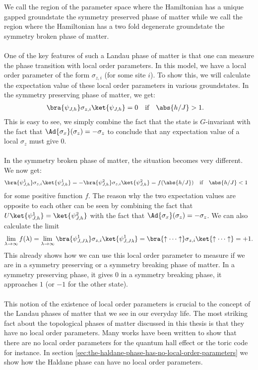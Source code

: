 We call the region of the parameter space where the Hamiltonian has a unique gapped groundstate the symmetry preserved phase of matter while we call the region where the Hamiltonian has a two fold degenerate groundstate the symmetry broken phase of matter.\\\\
One of the key features of such a Landau phase of matter is that one can measure the phase transition with local order parameters. In this model, we have a local order parameter of the form $\sigma_{z,i}$ (for some site $i$). To show this, we will calculate the expectation value of these local order parameters in various groundstates. In the symmetry preserving phase of matter, we get:
\begin{align}
	\bra{\psi_{J,h}}\sigma_{z,i} \ket{\psi_{J,h}}&=0&&\text{if}&\abs{h/J}&>1.
\end{align}
This is easy to see, we simply combine the fact that the state is $G$-invariant with the fact that $\Ad{\sigma_x}(\sigma_z)=-\sigma_z$ to conclude that any expectation value of a local $\sigma_z$ must give 0.
\\\\
In the symmetry broken phase of matter, the situation becomes very different. We now get:
\begin{align}
\bra{\psi_{J,h}^1}\sigma_{z,i} \ket{\psi_{J,h}^1}&=-\bra{\psi_{J,h}^2}\sigma_{z,i} \ket{\psi_{J,h}^2}=f(\abs{h/J})&&\text{if}&\abs{h/J}&<1
\end{align}
for some positive function $f$. The reason why the two expectation values are opposite to each other can be seen by combining the fact that $U\ket{\psi_{J,h}^1}=\ket{\psi_{J,h}^2}$ with the fact that $\Ad{\sigma_x}(\sigma_z)=-\sigma_z$. We can also calculate the limit
\begin{equation}
	\lim_{\lambda\rightarrow\infty}f(\lambda)=\lim_{\lambda\rightarrow\infty}\bra{\psi_{J,J\lambda}^1}\sigma_{z,i} \ket{\psi_{J,J\lambda}^1}=\bra{\uparrow\cdots\uparrow}\sigma_{z,i}\ket{\uparrow\cdots\uparrow}=+1.
\end{equation}
This already shows how we can use this local order parameter to measure if we are in a symmetry preserving or a symmetry breaking phase of matter. In a symmetry preserving phase, it gives 0 in a symmetry breaking phase, it approaches $1$ (or $-1$ for the other state).
\\\\
This notion of the existence of local order parameters is crucial to the concept of the Landau phases of matter that we see in our everyday life. The most striking fact about the topological phases of matter discussed in this thesis is that they have no local order parameters. Many works have been written to show that there are no local order parameters for the quantum hall effect or the toric code for instance. In section \ref{sec:the-haldane-phase-has-no-local-order-parameters} we show how the Haldane phase can have no local order parameters.
